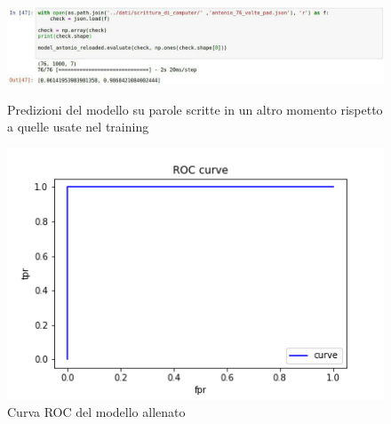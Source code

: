 \documentclass[8pt,notitlepage]{report}
\begin{document}
			\begin{figure}
				\begin{center}
					\label{figure:prediction}
					\includegraphics[scale=.5]{test_Antonio}
					\caption{Predizioni del modello su parole scritte in un altro momento rispetto a quelle usate nel training}
				\end{center}
			\end{figure}
			\newpage
			\begin{figure}[H]
				\begin{center}
					\includegraphics[scale=.5]{ROC_Antonio}
					\caption{Curva ROC del modello allenato}
				\end{center}
			\end{figure}
			
\end{document}
